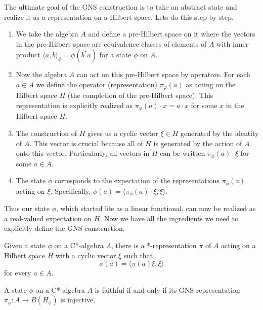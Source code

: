 The ultimate goal of the GNS construction is to take an abstract state
and realize it as a representation on a Hilbert space. Lets do this step by step.
\begin{enumerate}
    \item We take the algebra $A$ and define a pre-Hilbert space on it where the vectors
    in the pre-Hilbert space are equivalence classes of elements of $A$ with inner-product
    $\langle a, b \rangle_\phi = \phi(b^*a)$ for a state $\phi$ on $A$.
    \item Now the algebra $A$ can act on this pre-Hilbert space by operators. For
    each $a \in A$ we define the operator (representation) $\pi_\varphi (a)$ as acting
    on the Hilbert space $H$ (the completion of the pre-Hilbert space). This representation
    is explicitly realized as $\pi_\varphi(a) \cdot x = a \cdot x$ for some $x$ in
    the Hilbert space $H$.
    \item The construction of $H$ gives us a cyclic vector $\xi \in H$ generated by
    the identity of $A$. This vector is crucial because all of $H$ is generated
    by the action of $A$ onto this vector. Particularly, all vectors in $H$ can
    be written $\pi_\phi(a) \cdot \xi$ for some $a \in A$.
    \item The state $\phi$ corresponds to the expectation of the representations
    $\pi_\phi(a)$ acting on $\xi$. Specifically, $\phi(a) = \langle \pi_\phi(a) \cdot \xi, \xi \rangle$.
\end{enumerate}
Thus our state $\phi$, which started life as a linear functional, can now be realized
as a real-valued expectation on $H$. Now we have all the ingredients we need to
explicitly define the GNS construction.

\begin{theorem}
    Given a state $\phi$ on a C*-algebra $A$, there is a *-representation $\pi$ of $A$ acting
    on a Hilbert space $H$ with a cyclic vector $\xi$ such that
    \begin{equation}
        \phi(a) = \langle \pi(a)\xi , \xi \rangle
    \end{equation}
    for every $a \in A$.
\end{theorem}

\begin{theorem}
    A state $\phi$ on a C*-algebra $A$ is faithful if and only if its GNS representation
    $\pi_\phi: A \to B(H_\phi)$ is injective.
\end{theorem}


